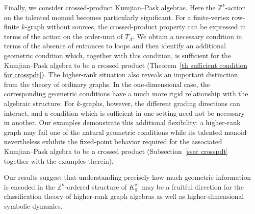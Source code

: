 \documentclass[a4paper,reqno,12pt]{amsart}
\numberwithin{equation}{section}
\theoremstyle{definition}
\theoremstyle{remark}
\begin{document}
Finally, we consider crossed-product Kumjian--Pask algebras. Here the $\mathbb Z^k$-action on the talented monoid becomes particularly significant. For a finite-vertex row-finite $k$-graph without sources, the crossed-product property can be expressed in terms of the action on the order-unit of $T_\Lambda$. We obtain a necessary condition in terms of the absence of entrances to loops and then identify an additional geometric condition which, together with this condition, is sufficient for the Kumjian--Pask algebra to be a crossed product (Theorem~\ref{th sufficient condition for crosspdt}). The higher-rank situation also reveals an important distinction from the theory of ordinary graphs. In the one-dimensional case, the corresponding geometric conditions have a much more rigid relationship with the algebraic structure. For $k$-graphs, however, the different grading directions can interact, and a condition which is sufficient in one setting need not be necessary in another. Our examples demonstrate this additional flexibility: a higher-rank graph may fail one of the natural geometric conditions while its talented monoid nevertheless exhibits the fixed-point behavior required for the associated Kumjian--Pask algebra to be a crossed product (Subsection~\ref{ssec crosspdt} together with the examples therein).

Our results suggest that understanding precisely how much geometric information is encoded in the $\mathbb Z^k$-ordered structure of $K_0^{\mathrm{gr}}$ may be a fruitful direction for the classification theory of higher-rank graph algebras as well as higher-dimensional symbolic dynamics. 
\end{document}
